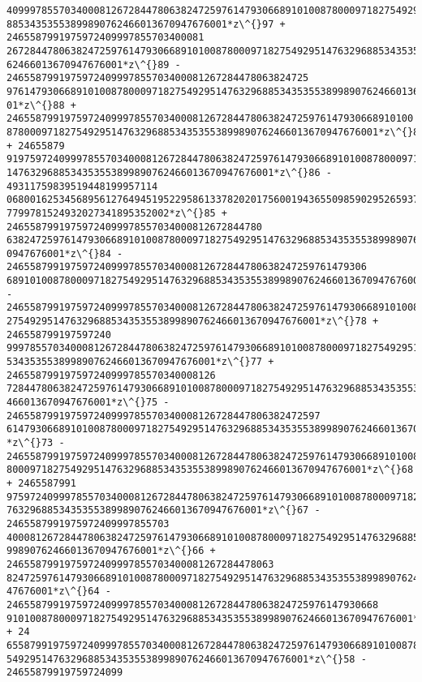\documentclass[11pt]{article}
\begin{document}
\begin{tcolorbox}[breakable, size=fbox, boxrule=.5pt, pad at break*=1mm, opacityfill=0]
\begin{Verbatim}[commandchars=\\\{\}]
40999785570340008126728447806382472597614793066891010087800097182754929514763296
88534353553899890762466013670947676001*z\^{}97 + 2465587991975972409997855703400081
26728447806382472597614793066891010087800097182754929514763296885343535538998907
62466013670947676001*z\^{}89 - 2465587991975972409997855703400081267284478063824725
97614793066891010087800097182754929514763296885343535538998907624660136709476760
01*z\^{}88 + 2465587991975972409997855703400081267284478063824725976147930668910100
8780009718275492951476329688534353553899890762466013670947676001*z\^{}87 + 24655879
91975972409997855703400081267284478063824725976147930668910100878000971827549295
1476329688534353553899890762466013670947676001*z\^{}86 - 49311759839519448199957114
06800162534568956127649451952295861337820201756001943655098590295265937706870710
7799781524932027341895352002*z\^{}85 + 24655879919759724099978557034000812672844780
63824725976147930668910100878000971827549295147632968853435355389989076246601367
0947676001*z\^{}84 - 24655879919759724099978557034000812672844780638247259761479306
689101008780009718275492951476329688534353553899890762466013670947676001*z\^{}83 - 
24655879919759724099978557034000812672844780638247259761479306689101008780009718
275492951476329688534353553899890762466013670947676001*z\^{}78 + 246558799197597240
99978557034000812672844780638247259761479306689101008780009718275492951476329688
534353553899890762466013670947676001*z\^{}77 + 246558799197597240999785570340008126
72844780638247259761479306689101008780009718275492951476329688534353553899890762
466013670947676001*z\^{}75 - 246558799197597240999785570340008126728447806382472597
61479306689101008780009718275492951476329688534353553899890762466013670947676001
*z\^{}73 - 246558799197597240999785570340008126728447806382472597614793066891010087
80009718275492951476329688534353553899890762466013670947676001*z\^{}68 + 2465587991
97597240999785570340008126728447806382472597614793066891010087800097182754929514
76329688534353553899890762466013670947676001*z\^{}67 - 2465587991975972409997855703
40008126728447806382472597614793066891010087800097182754929514763296885343535538
99890762466013670947676001*z\^{}66 + 2465587991975972409997855703400081267284478063
82472597614793066891010087800097182754929514763296885343535538998907624660136709
47676001*z\^{}64 - 2465587991975972409997855703400081267284478063824725976147930668
9101008780009718275492951476329688534353553899890762466013670947676001*z\^{}59 + 24
65587991975972409997855703400081267284478063824725976147930668910100878000971827
5492951476329688534353553899890762466013670947676001*z\^{}58 - 24655879919759724099

\end{Verbatim}
\end{tcolorbox}
\end{document}
